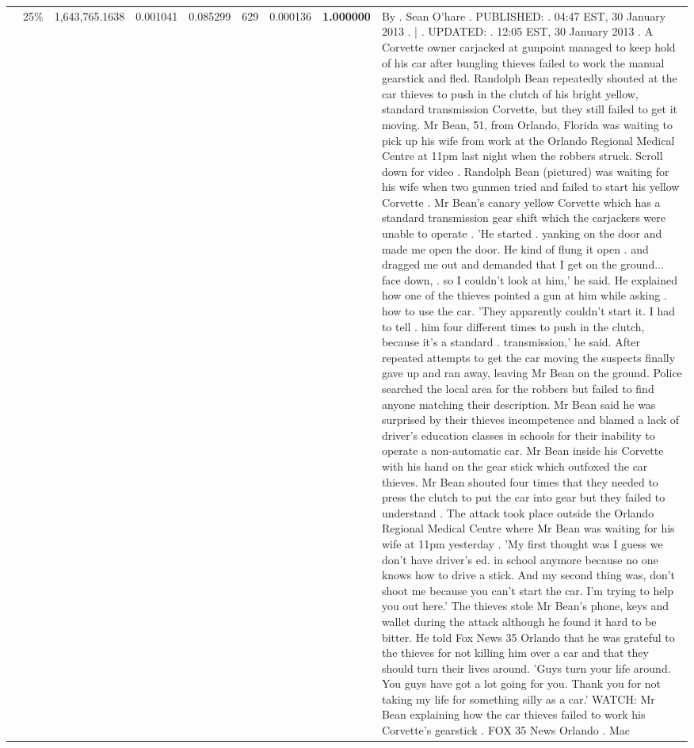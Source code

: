 \begin{table}[H]
\begin{tabular}{llrrrrrrl}
 & 25\% & 1,643,765.1638 & 0.001041 & 0.085299 & \color{red} 629 & 0.000136 & \bfseries \color{red} 1.000000 & By . Sean O'hare . PUBLISHED: . 04:47 EST, 30 January 2013 . | . UPDATED: . 12:05 EST, 30 January 2013 . A Corvette owner carjacked at gunpoint managed to keep hold of his car after bungling thieves failed to work the manual gearstick and fled. Randolph Bean repeatedly shouted at the car thieves to push in the clutch of his bright yellow, standard transmission Corvette, but they still failed to get it moving. Mr Bean, 51, from Orlando, Florida was waiting to pick up his wife from work at the Orlando Regional Medical Centre at 11pm last night when the robbers struck. Scroll down for video . Randolph Bean (pictured) was waiting for his wife when two gunmen tried and failed to start his yellow Corvette . Mr Bean's canary yellow Corvette which has a standard transmission gear shift which the carjackers were unable to operate . 'He started . yanking on the door and made me open the door. He kind of flung it open . and dragged me out and demanded that I get on the ground... face down, . so I couldn't look at him,' he said. He explained how one of the thieves pointed a gun at him while asking . how to use the car. 'They apparently couldn't start it. I had to tell . him four different times to push in the clutch, because it's a standard . transmission,' he said. After repeated attempts to get the car moving the suspects finally gave up and ran away, leaving Mr Bean on the ground. Police searched the local area for the robbers but failed to find anyone matching their description. Mr Bean said he was surprised by their thieves incompetence and blamed a lack of driver's education classes in schools for their inability to operate a non-automatic car. Mr Bean inside his Corvette with his hand on the gear stick which outfoxed the car thieves. Mr Bean shouted four times that they needed to press the clutch to put the car into gear but they failed to understand . The attack took place outside the Orlando Regional Medical Centre where Mr Bean was waiting for his wife at 11pm yesterday . 'My first thought was I guess we don't have driver's ed. in school anymore because no one knows how to drive a stick. And my second thing was, don't shoot me because you can't start the car. I'm trying to help you out here.' The thieves stole Mr Bean's phone, keys and wallet during the attack although he found it hard to be bitter. He told Fox News 35 Orlando that he was grateful to the thieves for not killing him over a car and that they should turn their lives around. 'Guys turn your life around. You guys have got a lot going for you. Thank you for not taking my life for something silly as a car.' WATCH: Mr Bean explaining how the car thieves failed to work his Corvette's gearstick . FOX 35 News Orlando . Mac \\

\end{tabular}
\end{table}
